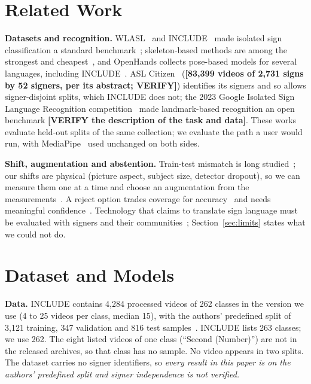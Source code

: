 \documentclass[conference]{IEEEtran}
\newcommand{\todo}[1]{{\color{blue}\textbf{[#1]}}}
\begin{document}
\section{Related Work}
\textbf{Datasets and recognition.} WLASL~\cite{li2020wlasl} and INCLUDE~\cite{sridhar2020include} made isolated sign classification a standard benchmark~\cite{rastgoo2021survey}; skeleton-based methods are among the strongest and cheapest~\cite{jiang2021sam}, and OpenHands collects pose-based models for several languages, including INCLUDE~\cite{selvaraj2022openhands}. ASL Citizen~\cite{desai2023aslcitizen} (\todo{83,399 videos of 2,731 signs by 52 signers, per its abstract; VERIFY}) identifies its signers and so allows signer-disjoint splits, which INCLUDE does not; the 2023 Google Isolated Sign Language Recognition competition~\cite{kaggle2023islr} made landmark-based recognition an open benchmark \todo{VERIFY the description of the task and data}. These works evaluate held-out splits of the same collection; we evaluate the path a user would run, with MediaPipe~\cite{lugaresi2019mediapipe,bazarevsky2020blazepose,zhang2020mediapipehands} used unchanged on both sides.

\textbf{Shift, augmentation and abstention.} Train-test mismatch is long studied~\cite{quinonero2009dataset,torralba2011bias,koh2021wilds,hendrycks2019robustness,damour2022underspecification}; our shifts are physical (picture aspect, subject size, detector dropout), so we can measure them one at a time and choose an augmentation from the measurements~\cite{shorten2019augmentation}. A reject option trades coverage for accuracy~\cite{geifman2017selective} and needs meaningful confidence~\cite{guo2017calibration}. Technology that claims to translate sign language must be evaluated with signers and their communities~\cite{bragg2019interdisciplinary}; Section~\ref{sec:limits} states what we could not do.

\section{Dataset and Models}\label{sec:data}
\textbf{Data.} INCLUDE contains 4,284 processed videos of 262 classes in the version we use (4 to 25 videos per class, median 15), with the authors' predefined split of 3,121 training, 347 validation and 816 test samples~\cite{sridhar2020include}. INCLUDE lists 263 classes; we use 262. The eight listed videos of one class (``Second (Number)'') are not in the released archives, so that class has no sample. No video appears in two splits. The dataset carries no signer identifiers, so \emph{every result in this paper is on the authors' predefined split and signer independence is not verified.}
\end{document}

